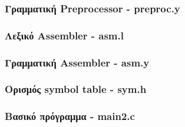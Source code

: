 \documentclass[11pt]{extarticle}
\begin{document}
\subsubsection{Γραμματική Preprocessor - preproc.y}


\subsubsection{Λεξικό Assembler - asm.l}


\subsubsection{Γραμματική Assembler - asm.y}


\subsubsection{Ορισμός symbol table - sym.h}


\subsubsection{Βασικό πρόγραμμα - main2.c}

\end{document}
